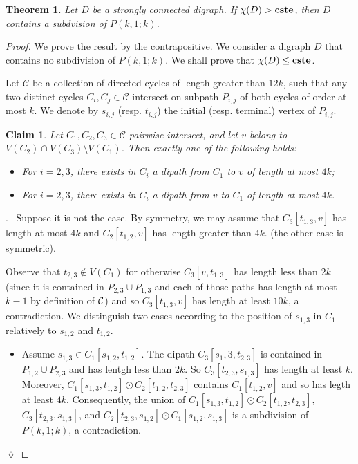 \documentclass[utf8,10pt]{article}
\theoremstyle{plain}
\newtheorem{theorem}{Theorem}
\newtheorem{claim}{Claim}[theorem]
\theoremstyle{definition}
\theoremstyle{remark}
\newenvironment{subproof}{\par\noindent {\it Subproof}.\ }{\hfill$\lozenge$\par\vspace{11pt}}
\newcommand{\cste}{\bf cste}
\begin{document}
\begin{theorem}
Let $D$ be a strongly connected digraph. If $\chi(D) > \cste$, then $D$ contains a subdvision of $P(k,1;k)$.
\end{theorem}
\begin{proof}
We prove the result by the contrapositive. We consider a digraph $D$ that contains no subdivision of $P(k,1;k)$.
We shall prove that $\chi(D) \leq \cste$.

\medskip


Let $\mathcal{C}$ be a collection of directed cycles of length greater than $12k$, such
that any two distinct cycles $C_i,C_j\in\mathcal C$ intersect on  subpath $P_{i,j}$ of both cycles of order at most $k$.
We denote by $s_{i,j}$ (resp. $t_{i,j}$) the initial (resp. terminal) vertex of  $P_{i,j}$.
 
 
 \begin{claim}\label{claim:dis}
Let $C_1,C_2,C_3\in\mathcal C$ pairwise intersect, and let $v$ belong to $V(C_2)\cap V(C_3)\setminus V(C_1)$. Then exactly one of the following holds:
\begin{itemize}
\item For $i=2,3$, there exists in $C_i$ a dipath from $C_1$ to $v$ of length at most $4k$; 
\item For $i=2,3$, there exists in $C_i$ a dipath from $v$ to $C_1$ of length at most $4k$.
\end{itemize}
\end{claim}

\begin{subproof}
Suppose it is not the case. By symmetry, we may assume that $C_3[t_{1,3},v]$ has length at most $4k$ and
$C_2[t_{1,2},v]$ has length greater than $4k$. (the other case is symmetric).

Observe that $t_{2,3}\notin V(C_1)$ for otherwise $C_3[v,t_{1,3}]$ has length less than $2k$ (since it is contained in $P_{2,3}\cup P_{1,3}$ and each of those paths has length at most $k-1$ by definition of ${\cal C}$) and so $C_3[t_{1,3},v]$ has length at least $10k$, a contradiction.
We distinguish two cases according to the position of $s_{1,3}$ in $C_1$ relatively to $s_{1,2}$ and $t_{1,2}$.

\begin{itemize}
	\item Assume $s_{1,3}\in C_1[s_{1,2},t_{1,2}]$. The dipath  $C_3[s_1,3,t_{2,3}]$ is contained in $P_{1,2}\cup P_{2,3}$ and has lentgh less than $2k$. So $C_3[t_{2,3}, s_{1,3}]$ has length at least $k$. Moreover, $C_1[s_{1,3}, t_{1,2}]\odot C_2[t_{1,2}, t_{2,3}]$ contains $C_1[t_{1,2}, v]$  and so has legth at least $4k$. Consequently, the union of $C_1[s_{1,3}, t_{1,2}]\odot C_2[t_{1,2}, t_{2,3}]$, $C_3[t_{2,3}, s_{1,3}]$, and
$C_2[t_{2,3}, s_{1,2}]\odot C_1[s_{1,2}, s_{1,3}]$ is a subdivision of $P(k,1;k)$, a contradiction.


\end{itemize}
\end{subproof}
\end{proof}
\end{document}
